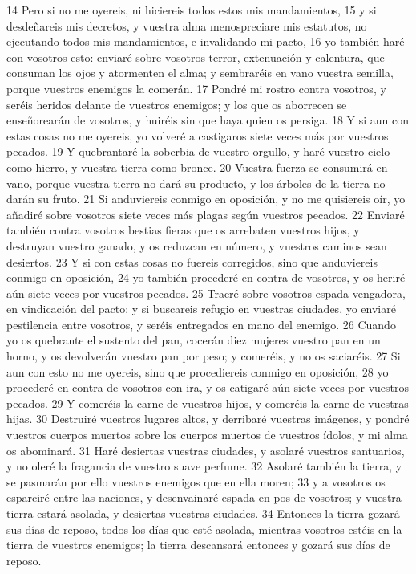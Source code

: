14 Pero si no me oyereis, ni hiciereis todos estos mis mandamientos,
15 y si desdeñareis mis decretos, y vuestra alma menospreciare mis estatutos, no ejecutando todos mis mandamientos, e invalidando mi pacto,
16 yo también haré con vosotros esto: enviaré sobre vosotros terror, extenuación y calentura, que consuman los ojos y atormenten el alma; y sembraréis en vano vuestra semilla, porque vuestros enemigos la comerán.
17 Pondré mi rostro contra vosotros, y seréis heridos delante de vuestros enemigos; y los que os aborrecen se enseñorearán de vosotros, y huiréis sin que haya quien os persiga.
18 Y si aun con estas cosas no me oyereis, yo volveré a castigaros siete veces más por vuestros pecados.
19 Y quebrantaré la soberbia de vuestro orgullo, y haré vuestro cielo como hierro, y vuestra tierra como bronce.
20 Vuestra fuerza se consumirá en vano, porque vuestra tierra no dará su producto, y los árboles de la tierra no darán su fruto.
21 Si anduviereis conmigo en oposición, y no me quisiereis oír, yo añadiré sobre vosotros siete veces más plagas según vuestros pecados.
22 Enviaré también contra vosotros bestias fieras que os arrebaten vuestros hijos, y destruyan vuestro ganado, y os reduzcan en número, y vuestros caminos sean desiertos.
23 Y si con estas cosas no fuereis corregidos, sino que anduviereis conmigo en oposición,
24 yo también procederé en contra de vosotros, y os heriré aún siete veces por vuestros pecados.
25 Traeré sobre vosotros espada vengadora, en vindicación del pacto; y si buscareis refugio en vuestras ciudades, yo enviaré pestilencia entre vosotros, y seréis entregados en mano del enemigo.
26 Cuando yo os quebrante el sustento del pan, cocerán diez mujeres vuestro pan en un horno, y os devolverán vuestro pan por peso; y comeréis, y no os saciaréis.
27 Si aun con esto no me oyereis, sino que procediereis conmigo en oposición,
28 yo procederé en contra de vosotros con ira, y os catigaré aún siete veces por vuestros pecados.
29 Y comeréis la carne de vuestros hijos, y comeréis la carne de vuestras hijas.
30 Destruiré vuestros lugares altos, y derribaré vuestras imágenes, y pondré vuestros cuerpos muertos sobre los cuerpos muertos de vuestros ídolos, y mi alma os abominará.
31 Haré desiertas vuestras ciudades, y asolaré vuestros santuarios, y no oleré la fragancia de vuestro suave perfume.
32 Asolaré también la tierra, y se pasmarán por ello vuestros enemigos que en ella moren;
33 y a vosotros os esparciré entre las naciones, y desenvainaré espada en pos de vosotros; y vuestra tierra estará asolada, y desiertas vuestras ciudades.
34 Entonces la tierra gozará sus días de reposo, todos los días que esté asolada, mientras vosotros estéis en la tierra de vuestros enemigos; la tierra descansará entonces y gozará sus días de reposo.
